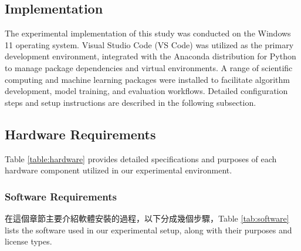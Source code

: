 \begin{ZhChapter}

    \chapter{Implementation}
    The experimental implementation of this study was conducted on the Windows 11 operating system. Visual Studio Code (VS Code) was utilized as the primary development environment, integrated with the Anaconda distribution for Python to manage package dependencies and virtual environments. A range of scientific computing and machine learning packages were installed to facilitate algorithm development, model training, and evaluation workflows. Detailed configuration steps and setup instructions are described in the following subsection.

    \section{Hardware Requirements}

    Table \ref{table:hardware} provides detailed specifications and purposes of each hardware component utilized in our experimental environment.

    \begin{table}[htbp]
        \centering
        \caption{Hardware Requirements} \label{table:hardware}
    \end{table}


    \subsection{Software Requirements}
    在這個章節主要介紹軟體安裝的過程，以下分成幾個步驟，Table \ref{tab:software} lists the software used in our experimental setup, along with their purposes and license types.




\end{ZhChapter}
